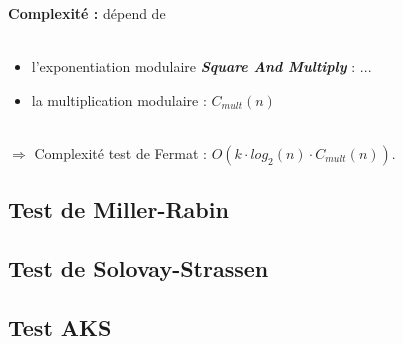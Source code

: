 			\begin{frame}
				\textbf{Complexité :} dépend de \\~\\
				\begin{itemize}
				\item l'exponentiation modulaire \textbf{\textit{Square And Multiply}} : ...
				\item la multiplication modulaire : $C_{mult}(n)$
				\end{itemize}
				~\\
				$\Longrightarrow$ Complexité test de Fermat : $O(k \cdot log_{2}(n) \cdot C_{mult}(n))$.
			\end{frame}
		
		\subsection{Test de Miller-Rabin}
			\begin{frame}
		
			\end{frame}
			
			\begin{frame}
		
			\end{frame}
			
			\begin{frame}
		
			\end{frame}
		
		\subsection{Test de Solovay-Strassen}	
			\begin{frame}
		
			\end{frame}
			
			\begin{frame}
		
			\end{frame}
			
			\begin{frame}
		
			\end{frame}	
		
		\subsection{Test AKS}	
			\begin{frame}
		
			\end{frame}
			
